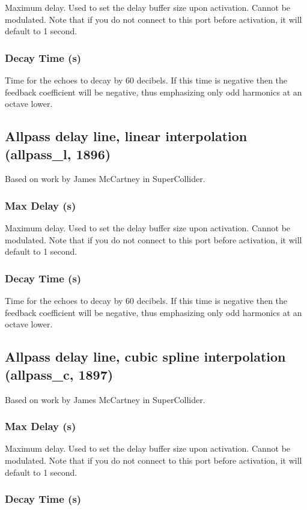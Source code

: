 \documentclass[11pt]{article}
\begin{document}
       Maximum delay. Used to set the delay buffer size upon activation. Cannot
       be modulated. Note that if you do not connect to this port before
       activation, it will default to 1 second. 
      \subsubsection*{Decay Time (s)}

       Time for the echoes to decay by 60 decibels. If this time is negative
       then the feedback coefficient will be negative, thus emphasizing only odd
       harmonics at an octave lower.
      \subsection{Allpass delay line, linear interpolation (allpass\_l, 1896)\label{allpass_l}\label{id1896}}
Based on work by James McCartney in SuperCollider.\subsubsection*{Max Delay (s)}

       Maximum delay. Used to set the delay buffer size upon activation. Cannot
       be modulated. Note that if you do not connect to this port before
       activation, it will default to 1 second. 
      \subsubsection*{Decay Time (s)}

       Time for the echoes to decay by 60 decibels. If this time is negative
       then the feedback coefficient will be negative, thus emphasizing only odd
       harmonics at an octave lower.
      \subsection{Allpass delay line, cubic spline interpolation (allpass\_c, 1897)\label{allpass_c}\label{id1897}}
Based on work by James McCartney in SuperCollider.\subsubsection*{Max Delay (s)}

       Maximum delay. Used to set the delay buffer size upon activation. Cannot
       be modulated. Note that if you do not connect to this port before
       activation, it will default to 1 second. 
      \subsubsection*{Decay Time (s)}
\end{document}
